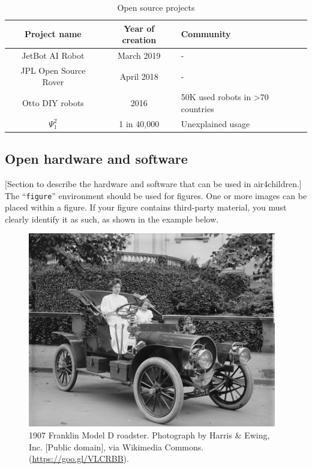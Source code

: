 \documentclass[sigconf]{acmart}
\begin{document}
\begin{table}
  \caption{Open source projects}
  \label{tab:opensourceprojects}
  \begin{tabular}{ccl}
    \toprule
    Project name& Year of creation & Community\\
    \midrule
    JetBot AI Robot \cite{nanoJetBot:2019} & March 2019 & - \\
    JPL Open Source Rover \cite{OSR:2018} & April 2018 & - \\
    Otto DIY robots \cite{OttoDIY:2016} & 2016 & 50K used robots in >70 countries\\
    $\Psi^2_1$ & 1 in 40,000& Unexplained usage\\
  \bottomrule
\end{tabular}
\end{table}


\subsection{Open hardware and software}
[Section to describe the hardware and software that can be used in 
air4children.]
The ``\verb|figure|'' environment should be used for figures. One or
more images can be placed within a figure. If your figure contains
third-party material, you must clearly identify it as such, as shown
in the example below.
\begin{figure}[h]
  \centering
  \includegraphics[width=\linewidth]{sample-franklin}
  \caption{1907 Franklin Model D roadster. Photograph by Harris \&
    Ewing, Inc. [Public domain], via Wikimedia
    Commons. (\url{https://goo.gl/VLCRBB}).}
\end{figure}
\end{document}
